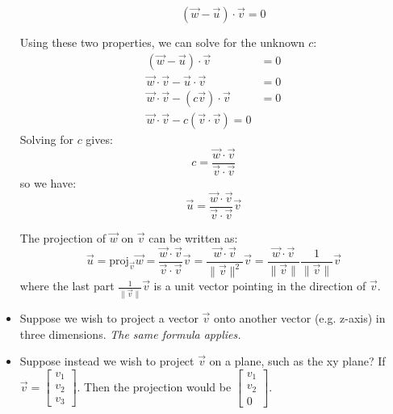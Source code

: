 \begin{itemize}
\begin{itemize}
        \begin{equation}
            (\vec{w}-\vec{u})\cdot \vec{v}=0
            \label{eq:}
        \end{equation}
    \end{itemize}
    Using these two properties, we can solve for the unknown $c$:
    \begin{align}
        (\vec{w}-\vec{u})\cdot \vec{v} &= 0 \\
        \vec{w}\cdot\vec{v}-\vec{u}\cdot\vec{v} &= 0 \\
        \vec{w}\cdot\vec{v}-(c\vec{v})\cdot\vec{v} &= 0 \\ 
        \vec{w}\cdot\vec{v}-c\left(\vec{v}\cdot\vec{v}\right) = 0 
    \end{align}
    Solving for $c$ gives:
    \begin{equation}
        c=\frac{\vec{w}\cdot\vec{v}}{\vec{v}\cdot\vec{v}}
        \label{eq:}
    \end{equation}
    so we have:
    \begin{equation}
        \boxed{\vec{u}=\frac{\vec{w}\cdot\vec{v}}{\vec{v}\cdot\vec{v}}\vec{v}}
        \label{eq:}
    \end{equation}
    \begin{definition}
        The projection of $\vec{w}$ on $\vec{v}$ can be written as:
        \begin{equation}
            \vec{u}=\text{proj}_{\vec{v}}\vec{w}
            =
            \frac{\vec{w}\cdot\vec{v}}{\vec{v}\cdot\vec{v}}\vec{v}
            = \frac{\vec{w}\cdot\vec{v}}{\lVert \vec{v} \rVert^2} \vec{v}
            = \frac{\vec{w}\cdot\vec{v}}{\lVert \vec{v} \rVert} \frac{1}{\lVert\vec{v}\rVert}\vec{v}
            \label{eq:}
        \end{equation}
        where the last part $\frac{1}{\lVert\vec{v}\rVert}\vec{v}$ is a unit vector pointing in the direction of $\vec{v}$.
    \end{definition}
    \item Suppose we wish to project a vector $\vec{v}$ onto another vector (e.g. z-axis) in three dimensions. \textit{The same formula applies.}
    \item Suppose instead we wish to project $\vec{v}$ on a plane, such as the xy plane? If $\vec{v}=\begin{bmatrix}
        v_1\\v_2\\v_3
    \end{bmatrix}$. Then the projection would be $\begin{bmatrix}
        v_1\\v_2\\0
    \end{bmatrix}$.
\end{itemize}
